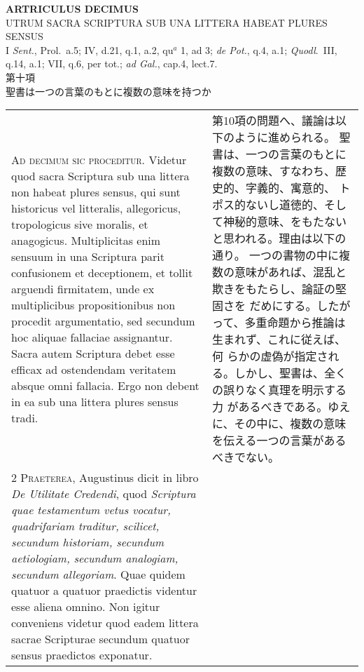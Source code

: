\documentclass[10pt]{jsarticle} %
\begin{document}
\begin{center}
 {\Large {\bf ARTRICULUS DECIMUS}}\\
 {\large UTRUM SACRA SCRIPTURA SUB UNA LITTERA HABEAT PLURES SENSUS}\\
 {\footnotesize I {\itshape Sent.}, Prol.~a.5; IV, d.21, q.1, a.2, qu$^a$ 1, ad 3; {\itshape de Pot.}, q.4, a.1; {\itshape Quodl}.~III, q.14, a.1; VII, q.6, per tot.; {\itshape ad Gal.}, cap.4, lect.7.}\\
 {\Large 第十項\\聖書は一つの言葉のもとに複数の意味を持つか}
\end{center}

\begin{longtable}{p{21em}p{21em}}

{\Huge A}{\scshape d decimum sic proceditur}. Videtur quod
 sacra Scriptura sub una littera non habeat plures sensus, qui sunt
 historicus vel litteralis, allegoricus, tropologicus sive moralis, et
 anagogicus. Multiplicitas enim sensuum in una Scriptura parit
 confusionem et deceptionem, et tollit arguendi firmitatem, unde ex
 multiplicibus propositionibus non procedit argumentatio, sed secundum
 hoc aliquae fallaciae assignantur. Sacra autem Scriptura debet esse
 efficax ad ostendendam veritatem absque omni fallacia. Ergo non debent
 in ea sub una littera plures sensus tradi.



&

第10項の問題へ、議論は以下のように進められる。
聖書は、一つの言葉のもとに複数の意味、すなわち、歴史的、字義的、寓意的、
 トポス的ないし道徳的、そして神秘的意味、をもたないと思われる。理由は以下の通り。
一つの書物の中に複数の意味があれば、混乱と欺きをもたらし、論証の堅固さを
 だめにする。したがって、多重命題から推論は生まれず、これに従えば、何
 らかの虚偽が指定される。しかし、聖書は、全くの誤りなく真理を明示する力
 があるべきである。ゆえに、その中に、複数の意味を伝える一つの言葉がある
 べきでない。


\\


{\scshape 2 Praeterea}, Augustinus dicit in libro {\itshape De Utilitate Credendi},
 quod {\itshape Scriptura quae testamentum vetus vocatur, quadrifariam traditur,
 scilicet, secundum historiam, secundum aetiologiam, secundum analogiam,
 secundum allegoriam}. Quae quidem quatuor a quatuor praedictis videntur
 esse aliena omnino. Non igitur conveniens videtur quod eadem littera
 sacrae Scripturae secundum quatuor sensus praedictos exponatur.




\end{longtable}
\end{document}
